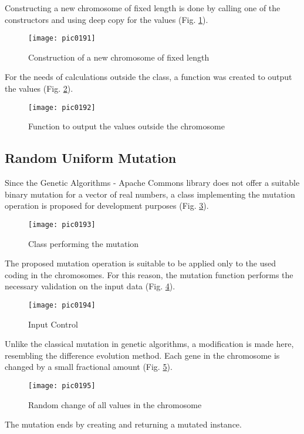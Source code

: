 Constructing a new chromosome of fixed length is done by calling one of the constructors and using deep copy for the values (Fig. \ref{fig:pic0191}).

\begin{figure}[h]
\centering
\texttt{[image: pic0191]}
\caption{Construction of a new chromosome of fixed length}
\label{fig:pic0191}
\end{figure}
\FloatBarrier

For the needs of calculations outside the class, a function was created to output the values (Fig. \ref{fig:pic0192}).

\begin{figure}[h]
\centering
\texttt{[image: pic0192]}
\caption{Function to output the values outside the chromosome}
\label{fig:pic0192}
\end{figure}
\FloatBarrier

\subsection{Random Uniform Mutation}

Since the Genetic Algorithms - Apache Commons library does not offer a suitable binary mutation for a vector of real numbers, a class implementing the mutation operation is proposed for development purposes (Fig. \ref{fig:pic0193}).

\begin{figure}[h]
\centering
\texttt{[image: pic0193]}
\caption{Class performing the mutation}
\label{fig:pic0193}
\end{figure}
\FloatBarrier

The proposed mutation operation is suitable to be applied only to the used coding in the chromosomes. For this reason, the mutation function performs the necessary validation on the input data (Fig. \ref{fig:pic0194}).

\begin{figure}[h]
\centering
\texttt{[image: pic0194]}
\caption{Input Control}
\label{fig:pic0194}
\end{figure}
\FloatBarrier

Unlike the classical mutation in genetic algorithms, a modification is made here, resembling the difference evolution method. Each gene in the chromosome is changed by a small fractional amount (Fig. \ref{fig:pic0195}).

\begin{figure}[h]
\centering
\texttt{[image: pic0195]}
\caption{Random change of all values in the chromosome}
\label{fig:pic0195}
\end{figure}
\FloatBarrier

The mutation ends by creating and returning a mutated instance.
